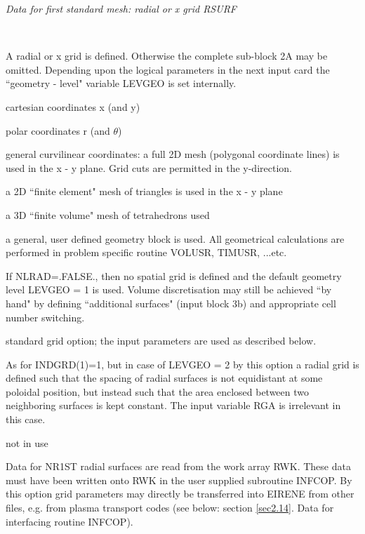 {\sl Data for first standard mesh: radial or x grid RSURF}

\begin{list}{ }{}
\item[{\bf NLRAD= .TRUE.}] ~

A radial or x grid is defined. Otherwise the complete
sub-block 2A may be omitted.
Depending upon the logical parameters in the next input card
the ``geometry - level" variable LEVGEO is set internally.
\begin{list}{ }{}
\item[{LEVGEO=1}]
cartesian coordinates x (and y)
\item[{LEVGEO=2}]
polar coordinates r (and $\theta$)
\item[{LEVGEO=3}]
general curvilinear coordinates: a full 2D mesh (polygonal
coordinate lines) is used in the x - y  plane. Grid cuts are
permitted in the y-direction.
\item[{LEVGEO=4}]
a 2D ``finite element" mesh of triangles is used in the x - y plane
\item[{LEVGEO=5}]
a 3D ``finite volume" mesh of tetrahedrons used
\item[{LEVGEO=10}]
a general, user defined geometry block is used.
All geometrical calculations are performed in problem specific routine
VOLUSR, TIMUSR, ...etc.
\end{list}
If NLRAD=.FALSE., then no spatial grid is defined
and the default geometry level LEVGEO = 1 is used.
Volume discretisation may still be achieved ``by hand" by defining ``additional
surfaces" (input block 3b) and appropriate cell number switching.

\item[{\bf INDGRD(1) }]
\begin{list}{ }{}
\item[{= 1 }]
standard grid option; the input parameters are used as described
below.
\item[{= 2 }]
As for INDGRD(1)=1, but
in case of LEVGEO = 2 by this option a radial grid is defined such
that the spacing
of radial surfaces is not equidistant at some poloidal position, but
instead such that the area enclosed between
two neighboring surfaces is kept constant. The input variable RGA
is irrelevant in this case.
\item[{= 3,4,5 }]
not in use
\item[{= 6 }]
Data for NR1ST radial surfaces
are read from the work array RWK. These
data must have been written onto RWK in the user supplied subroutine INFCOP.
By this option grid parameters may directly be transferred into
EIRENE from other files, e.g. from plasma transport codes
(see below: section \ref{sec2.14}. Data for interfacing routine INFCOP).
\end{list}
\end{list}

